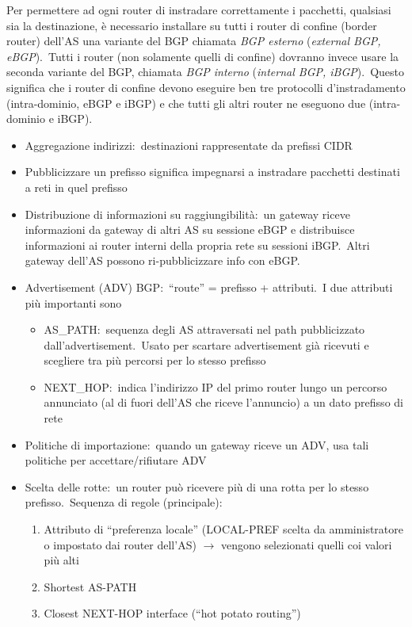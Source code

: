 Per permettere ad ogni router di instradare correttamente i pacchetti, qualsiasi sia la destinazione, è necessario installare su tutti i router di confine (border router) dell'AS una variante del BGP chiamata \emph{BGP esterno} (\emph{external BGP, eBGP}).\
Tutti i router (non solamente quelli di confine) dovranno invece usare la seconda variante del BGP, chiamata \emph{BGP interno} (\emph{internal BGP, iBGP}).\
Questo significa che i router di confine devono eseguire ben tre protocolli d'instradamento (intra-dominio, eBGP e iBGP) e che tutti gli altri router ne eseguono due (intra-dominio e iBGP).
\begin{itemize}
    \item Aggregazione indirizzi:\ destinazioni rappresentate da prefissi CIDR
    \item Pubblicizzare un prefisso significa impegnarsi a instradare pacchetti destinati a reti in quel prefisso
    \item Distribuzione di informazioni su raggiungibilità:\ un gateway riceve informazioni da gateway di altri AS su sessione eBGP e distribuisce informazioni ai router interni della propria rete su sessioni iBGP.\
          Altri gateway dell’AS possono ri-pubblicizzare info con eBGP.
    \item Advertisement (ADV) BGP:\ ``route'' = prefisso + attributi.\
          I due attributi più importanti sono
          \begin{itemize}
              \item AS\_PATH:\ sequenza degli AS attraversati nel path pubblicizzato dall’advertisement.\
                    Usato per scartare advertisement già ricevuti e scegliere tra più percorsi per lo stesso prefisso
              \item NEXT\_HOP:\ indica l'indirizzo IP del primo router lungo un percorso annunciato (al di fuori dell'AS che riceve l'annuncio) a un dato prefisso di rete
          \end{itemize}
    \item Politiche di importazione:\ quando un gateway riceve un ADV, usa tali politiche per accettare/rifiutare ADV
    \item Scelta delle rotte:\ un router può ricevere più di una rotta per lo stesso prefisso.\
          Sequenza di regole (principale):
          \begin{enumerate}
              \item Attributo di ``preferenza locale'' (LOCAL-PREF scelta da amministratore o impostato dai router dell’AS) $\rightarrow$ vengono selezionati quelli coi valori più alti
              \item Shortest AS-PATH
              \item Closest NEXT-HOP interface (``hot potato routing'')
          \end{enumerate}
\end{itemize}

